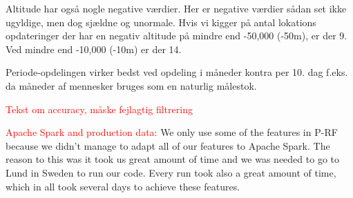 Altitude har også nogle negative værdier. Her er negative værdier sådan set ikke ugyldige, men dog sjældne og unormale. Hvis vi kigger på antal lokations opdateringer der har en negativ altitude på mindre end -50,000 (-50m), er der 9. Ved mindre end -10,000 (-10m) er der 14.

Periode-opdelingen virker bedst ved opdeling i måneder kontra per 10. dag f.eks. da måneder af mennesker bruges som en naturlig målestok.

\textcolor{red}{Tekst om accuracy, måske fejlagtig filtrering}

\textcolor{red}{Apache Spark and production data:} We only use some of the features in P-RF because we didn't manage to adapt all of our features to Apache Spark. The reason to this was it took us great amount of time and we was needed to go to Lund in Sweden to run our code. Every run took also a great amount of time, which in all took several days to achieve these features.